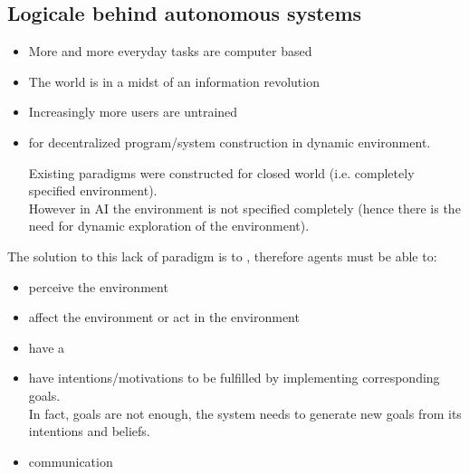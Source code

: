 \subsection{Logicale behind autonomous systems}
\begin{itemize}
\item More and more everyday tasks are computer based
\item The world is in a midst of an information revolution
\item Increasingly more users are untrained
\item {} for decentralized program/system construction in dynamic environment.

Existing paradigms were constructed for closed world (i.e. completely specified environment).\\
However in AI the environment is not specified completely (hence there is the need for dynamic exploration of the environment).
\end{itemize}

The solution to this lack of paradigm is to , therefore agents must be able to:
\begin{itemize}
\item perceive the environment
\item affect the environment or act in the environment
\item have a 
\item have intentions/motivations to be fulfilled by implementing corresponding goals.\\
In fact, goals are not enough, the system needs to generate new goals from its intentions and beliefs.
\item communication
\end{itemize}

